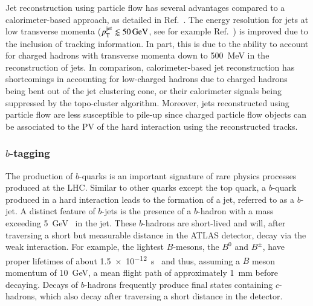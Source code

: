 Jet reconstruction using particle flow has several advantages compared to a
calorimeter-based approach, as detailed in Ref.~\cite{PERF-2015-09}. The energy
resolution for jets at low transverse momenta
($p_{\text{T}}^{\text{jet}} \lessapprox \SI{50}{\ensuremath{\text{GeV}}}$, see for example
Ref.~\cite{JETM-2018-05}) is improved due to the inclusion of tracking
information. In part, this is due to the ability to account for charged hadrons
with transverse momenta down to \SI{500}{\MeV} in the reconstruction of jets. In
comparison, calorimeter-based jet reconstruction has shortcomings in accounting
for low-\pT charged hadrons due to charged hadrons being bent out of the jet
clustering cone, or their calorimeter signals being suppressed by the
topo-cluster algorithm. Moreover, jets reconstructed using particle flow are
less susceptible to pile-up since charged particle flow objects can be
associated to the PV of the hard interaction using the reconstructed tracks.


\subsubsection{$b$-tagging}

The production of $b$-quarks is an important signature of rare physics processes
produced at the LHC. Similar to other quarks except the top quark, a $b$-quark
produced in a hard interaction leads to the formation of a jet, referred to as a
$b$-jet. A distinct feature of $b$-jets is the presence of a $b$-hadron with a
mass exceeding \SI{5}{\GeV}~\cite{pdg2020} in the jet. These $b$-hadrons are
short-lived and will, after traversing a short but measurable distance in the
ATLAS detector, decay via the weak interaction. For example, the lightest
$B$-mesons, the $B^0$ and $B^\pm$, have proper lifetimes of about
\SI{1.5e-12}{\second}~\cite{pdg2020} and thus, assuming a $B$ meson momentum of
\SI{10}{\GeV}, a mean flight path of approximately \SI{1}{\milli\metre} before
decaying. Decays of $b$-hadrons frequently produce final states containing
$c$-hadrons, which also decay after traversing a short distance in the detector.


